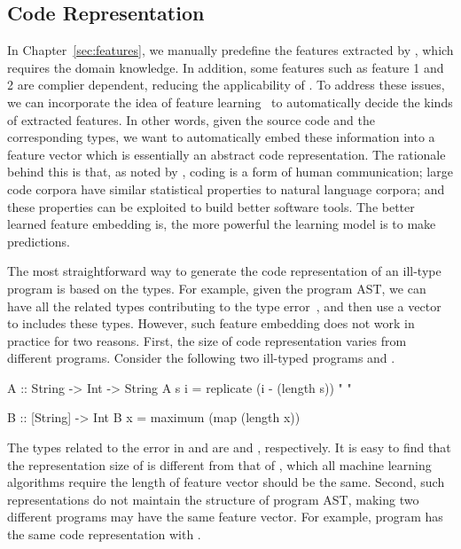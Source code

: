 \documentclass[12pt]{report}	%
\begin{document}
\subsection{Code Representation}
\label{sec:other2}

In Chapter~\ref{sec:features}, we manually predefine the features extracted by \newCompiler,
which requires the domain knowledge.
In addition, some features such as feature 1 and 2 are complier dependent,
reducing the applicability of \newCompiler.
%
To address these issues,
we can incorporate the idea of feature learning~\cite{bengio2013representation,Chae:2017:AGF:3152284.3133925}
to automatically decide the kinds of extracted features.
%
In other words, given the source code and the corresponding types,
we want to automatically embed these information into a feature vector which is essentially an abstract code representation.
%
The rationale behind this is that, as noted by \cite{allamanis2018survey},
coding is a form of human communication;
large code corpora have similar statistical properties to natural language corpora;
and these properties can be exploited to build better software tools.
%
The better learned feature embedding is, the more powerful the learning model is to make predictions.


The most straightforward way to generate the code representation of an ill-type program is based on the types.
For example, given the program AST, we can have all the related types contributing to the type error~\cite{Zhang15:DTE},
and then use a vector to includes these types.
%
However, such feature embedding does not work in practice for two reasons.
First, the size of code representation varies from different programs.
Consider the following two ill-typed programs  and .
%
\begin{program}
A :: String -> Int -> String
A s i = replicate (i - (length s)) " "
\end{program}
%
\begin{program}
B :: [String] -> Int
B x = maximum (map (length x))
\end{program}
%
The types related to the error in  and  are
and , respectively.
%
It is easy to find that the representation size of  is different from that of ,
which all machine learning algorithms require the length of feature vector should be the same.
%
Second, such representations do not maintain the structure of program AST,
making two different programs may have the same feature vector.
For example, program  has the same code representation with .
\end{document}
